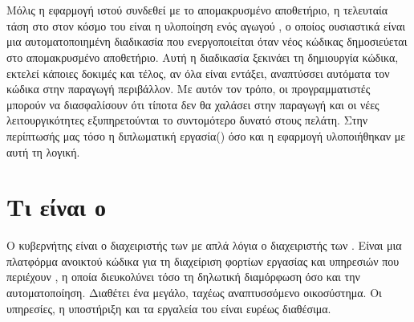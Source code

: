 \section{ }
Μόλις η εφαρμογή ιστού συνδεθεί με το απομακρυσμένο αποθετήριο, η τελευταία τάση στο
στον κόσμο του  είναι η υλοποίηση ενός αγωγού , ο οποίος ουσιαστικά
είναι μια αυτοματοποιημένη διαδικασία που ενεργοποιείται όταν νέος κώδικας δημοσιεύεται στο
απομακρυσμένο αποθετήριο. Αυτή η διαδικασία ξεκινάει τη δημιουργία κώδικα, εκτελεί κάποιες δοκιμές και
τέλος, αν όλα είναι εντάξει, αναπτύσσει αυτόματα τον κώδικα στην παραγωγή
περιβάλλον. Με αυτόν τον τρόπο, οι προγραμματιστές μπορούν να διασφαλίσουν ότι τίποτα δεν θα χαλάσει
στην παραγωγή και οι νέες λειτουργικότητες εξυπηρετούνται το συντομότερο δυνατό στους
πελάτη. Στην περίπτωσής μας τόσο η διπλωματική εργασία() όσο και η εφαρμογή υλοποιήθηκαν με αυτή τη λογική.


\section{Τι είναι ο  }
Ο κυβερνήτης είναι ο διαχειριστής των με απλά λόγια ο διαχειριστής των . Είναι μια 
πλατφόρμα ανοικτού κώδικα για τη διαχείριση φορτίων εργασίας και υπηρεσιών που περιέχουν 
, η οποία διευκολύνει τόσο τη δηλωτική διαμόρφωση όσο και την αυτοματοποίηση. 
Διαθέτει ένα μεγάλο, ταχέως αναπτυσσόμενο οικοσύστημα. Οι υπηρεσίες, η υποστήριξη και τα εργαλεία του  είναι ευρέως διαθέσιμα.




